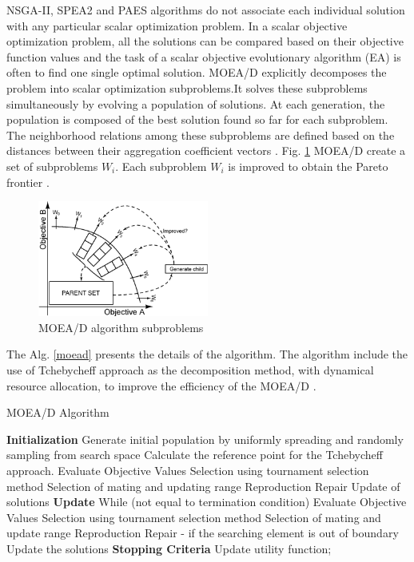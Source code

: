 \documentclass[espaco=umemeio,chapter=TITLE,twoside,openright]{abnt}
\begin{document}
NSGA-II, SPEA2 and PAES algorithms  do not associate each individual solution with
any particular scalar optimization problem. In a scalar objective optimization problem, all the solutions can be compared based
on their objective function values and the task of a scalar objective evolutionary algorithm (EA) is often to find one single
optimal solution. MOEA/D explicitly decomposes the problem into scalar optimization subproblems.It solves these subproblems simultaneously by evolving
a population of solutions. At each generation, the population is
composed of the best solution found so far for each subproblem. The neighborhood relations among these subproblems are defined based on the distances between their aggregation coefficient vectors \cite{Zhang2007} \cite{McConaghy2011}. Fig. \ref{fig:moead} MOEA/D create a set of subproblems $W_{i}$. Each subproblem $W_{i}$ is improved to obtain the Pareto frontier \cite{McConaghy2011}. 


\begin{figure}[h]
\centering
\includegraphics[width=0.5\textwidth]{./images/moead.png}
\caption{MOEA/D algorithm subproblems \cite{McConaghy2011}}
\label{fig:moead}
\end{figure}

The Alg. \ref{moead} presents the details of the algorithm. The algorithm  include the
use of Tchebycheff approach as the decomposition method, with dynamical resource allocation, to improve the efficiency of the MOEA/D \cite{Yuen2009}. 

\begin{algorithm}[h]
  \caption{MOEA/D Algorithm}
  \label{moead}
  \begin{algorithmic}[1]
    \State \textbf{Initialization}
    \State Generate initial population by uniformly spreading and randomly sampling from search space
    \State Calculate the reference point for the Tchebycheff approach.
   \State Evaluate Objective Values 
   \State Selection using tournament selection method 
   \State Selection of mating and updating range
   \State Reproduction
   \State Repair
   \State Update of solutions 
   \State \textbf{Update}
   \State While (not equal to termination condition)
  \State Evaluate Objective Values
  \State Selection using tournament selection method
  \State Selection of mating and update range
  \State Reproduction
  \State Repair - if the searching element is out of boundary
  \State Update the solutions 
  \State \textbf{Stopping Criteria}
  \State Update utility function;
  \EndIf    
  \end{algorithmic}
\end{algorithm}
\end{document}
